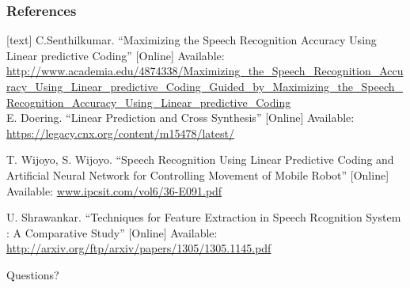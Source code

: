 \documentclass{beamer}
\begin{document}

\begin{frame}
\frametitle{References}
\small{
\begin{thebibliography}{99}
[text]
C.Senthilkumar. ``Maximizing the Speech Recognition Accuracy Using Linear predictive Coding'' [Online] Available: \url{http://www.academia.edu/4874338/Maximizing_the_Speech_Recognition_Accuracy_Using_Linear_predictive_Coding_Guided_by_Maximizing_the_Speech_Recognition_Accuracy_Using_Linear_predictive_Coding}\\

E. Doering. ``Linear Prediction and Cross Synthesis'' [Online] Available: \url{https://legacy.cnx.org/content/m15478/latest/}

T. Wijoyo, S. Wijoyo. ``Speech Recognition Using Linear Predictive Coding and Artificial Neural Network for Controlling Movement of Mobile Robot'' [Online] Available: \url{www.ipcsit.com/vol6/36-E091.pdf}

U. Shrawankar. ``Techniques for Feature Extraction in Speech
Rcognition System : A Comparative Study'' [Online] Available: \url{http://arxiv.org/ftp/arxiv/papers/1305/1305.1145.pdf}

\end{thebibliography}
}


\end{frame}


\begin{frame}
\Huge{\centerline{Questions?}}
\end{frame}

\end{document}
